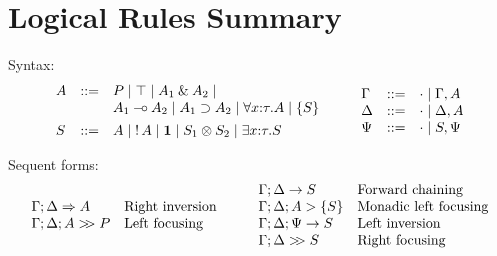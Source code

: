\documentclass{sig-alt}
\begin{document}
\appendix
\section*{Logical Rules Summary}
\label{apx:logical-rules-summary}
\onecolumn
\noindent Syntax:
$$
\begin{array}{lll}
A & ::= &  P 
      \mid \top 
      \mid A_1 \with A_2 
      \mid \\&& A_1 \limp A_2 
      \mid A_1 \iimp A_2 
      \mid \forall x{:}\tau.A  
      \mid \{ S \} 
\\[1ex]
S & ::= &  A
      \mid \bang A
      \mid \one 
      \mid S_1 \tensor S_2 
      \mid \exists x{:}\tau.S 
\end{array}
\qquad
\begin{array}{lll}
  \Gamma & ::= & \cdot \mid \Gamma, A \\
  \Delta & ::= & \cdot \mid \Delta, A \\%
  \Psi   & ::= & \cdot \mid S, \Psi \\
\end{array}
$$

\noindent Sequent forms:
$$
\begin{array}{ll}
  \Gamma;\Delta\Rightarrow A & \hbox{Right inversion} \\
  \Gamma;\Delta;A\mathrel{>\!\! >}P & \hbox{Left focusing} \\
\end{array}
\qquad
\begin{array}{ll}
  \Gamma;\Delta\rightarrow S & \hbox{Forward chaining} \\
  \Gamma;\Delta;A\mathrel>\{S\} & \hbox{Monadic left focusing} \\
  \Gamma;\Delta;\Psi\rightarrow S & \hbox{Left inversion} \\
  \Gamma;\Delta\mathrel{>\!\! >}S & \hbox{Right focusing} \\
\end{array}
$$
\end{document}
